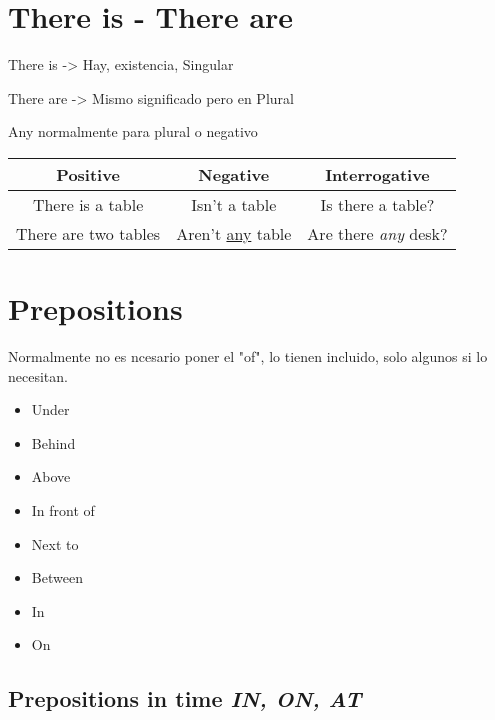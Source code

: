 \documentclass{elegantbook}
\begin{document}
        \section{There is - There are}
        \begin{property}
            There is -> Hay, existencia, Singular
        \end{property}
        \begin{property}
            There are -> Mismo significado pero en Plural
        \end{property}
        \begin{property}
            Any normalmente para plural o negativo
        \end{property}
        \vspace{1em}
        \begin{tabular}{|ccc|}
            \hline
            \textbf{Positive}&\textbf{Negative}&\textbf{Interrogative}\\
            \hline
            There is a table&Isn't a table&Is there a table?\\
            There are two tables&Aren't \underline{any} table&Are there \emph{any} desk?\\
            \hline
        \end{tabular}
        \section{Prepositions}
        \begin{property}
            Normalmente no es ncesario poner el "of", lo tienen incluido, solo algunos si lo necesitan.
        \end{property}
        \begin{itemize}
            \item Under
            \item Behind
            \item Above
            \item In front of
            \item Next to
            \item Between
            \item In
            \item On
        \end{itemize}
        \subsection{Prepositions in time \emph{IN, ON, AT}}
\end{document}
